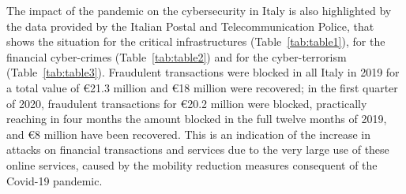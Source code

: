 \documentclass{easychair}
\begin{document}
\begin{table}[ht]
  \begin{center}
    \end{center}
	
	\caption{Distribution of digital attacks (detected by the respondents) wrt.\ geographical area, in 1Q-2020.}									
	\label{tab:table5}									
\end{table}

The impact of the pandemic on the cybersecurity in Italy is also highlighted by the data
provided by the Italian Postal and Telecommunication Police, that shows the situation for the
critical infrastructures (Table~\ref{tab:table1}), for the financial cyber-crimes
(Table~\ref{tab:table2}) and for the cyber-terrorism (Table~\ref{tab:table3}). 
Fraudulent transactions were blocked in all Italy in 2019 for a total value
of \euro 21.3 million and \euro 18 million were recovered; in the first quarter of 
2020, fraudulent transactions for \euro 20.2 million were blocked,
practically reaching in four months the amount
blocked in the full twelve months of 2019, and \euro 8 million have been
recovered. This is an indication of the increase in attacks on financial transactions
and services due to the very large use of these online services, caused by the mobility reduction
measures consequent of the Covid-19 pandemic.
\end{document}
